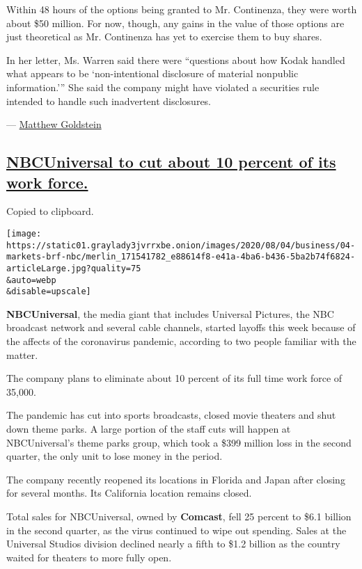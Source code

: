 Within 48 hours of the options being granted to Mr. Continenza, they
were worth about \$50 million. For now, though, any gains in the value
of those options are just theoretical as Mr. Continenza has yet to
exercise them to buy shares.

In her letter, Ms. Warren said there were ``questions about how Kodak
handled what appears to be `non-intentional disclosure of material
nonpublic information.''' She said the company might have violated a
securities rule intended to handle such inadvertent disclosures.

---
\href{https://www.nytimes3xbfgragh.onion/by/matthew-goldstein}{Matthew
Goldstein}

\hypertarget{nbcuniversal-to-cut-about-10-percent-of-its-work-force}{%
\subsection{\texorpdfstring{\protect\hyperlink{nbcuniversal-to-cut-about-10-percent-of-its-work-force}{NBCUniversal
to cut about 10 percent of its work
force.}}{NBCUniversal to cut about 10 percent of its work force.}}\label{nbcuniversal-to-cut-about-10-percent-of-its-work-force}}

Copied to clipboard.

\texttt{[image: https://static01.graylady3jvrrxbe.onion/images/2020/08/04/business/04-markets-brf-nbc/merlin\_171541782\_e88614f8-e41a-4ba6-b436-5ba2b74f6824-articleLarge.jpg?quality=75\\\&auto=webp\\\&disable=upscale]}

\textbf{NBCUniversal}, the media giant that includes Universal Pictures,
the NBC broadcast network and several cable channels, started layoffs
this week because of the affects of the coronavirus pandemic, according
to two people familiar with the matter.

The company plans to eliminate about 10 percent of its full time work
force of 35,000.

The pandemic has cut into sports broadcasts, closed movie theaters and
shut down theme parks. A large portion of the staff cuts will happen at
NBCUniversal's theme parks group, which took a \$399 million loss in the
second quarter, the only unit to lose money in the period.

The company recently reopened its locations in Florida and Japan after
closing for several months. Its California location remains closed.

Total sales for NBCUniversal, owned by \textbf{Comcast}, fell 25 percent
to \$6.1 billion in the second quarter, as the virus continued to wipe
out spending. Sales at the Universal Studios division declined nearly a
fifth to \$1.2 billion as the country waited for theaters to more fully
open.


